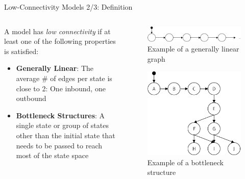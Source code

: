 \documentclass[aspectratio=169]{beamer}
\begin{document}
\begin{frame}{Low-Connectivity Models 2/3: Definition}
    \begin{columns}
        \begin{column}{.6\textwidth}
            A model has \emph{low connectivity} if at least one of the following properties is satisfied:
            \begin{itemize}
                \item \textbf{Generally Linear}: The average \# of edges per state is close to 2: One inbound, one outbound
                \item \textbf{Bottleneck Structures}: A single state or group of states other than the initial state that needs to be passed to reach most of the state space
            \end{itemize}
        \end{column}
        \begin{column}{.4\textwidth}
            \begin{figure}
                \includegraphics[width=.8\textwidth]{../figures/lc-ex-generally-linear}
                \caption{Example of a generally linear graph}
            \end{figure}
            \begin{figure}
                \includegraphics[width=.6\textwidth]{../figures/lc-ex-bottleneck}
                \caption{Example of a bottleneck structure}
            \end{figure}
        \end{column}
    \end{columns}
\end{frame}
\end{document}
